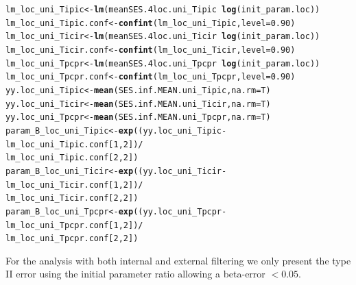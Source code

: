\documentclass[12pt]{article}\usepackage[]{graphicx}\usepackage[]{color}
\makeatletter
\newcommand{\hlnum}[1]{\textcolor[rgb]{0.686,0.059,0.569}{#1}}%
\newcommand{\hlopt}[1]{\textcolor[rgb]{0,0,0}{#1}}%
\newcommand{\hlstd}[1]{\textcolor[rgb]{0.345,0.345,0.345}{#1}}%
\newcommand{\hlkwb}[1]{\textcolor[rgb]{0.69,0.353,0.396}{#1}}%
\newcommand{\hlkwc}[1]{\textcolor[rgb]{0.333,0.667,0.333}{#1}}%
\newcommand{\hlkwd}[1]{\textcolor[rgb]{0.737,0.353,0.396}{\textbf{#1}}}%
\newenvironment{kframe}{%
 \def\at@end@of@kframe{}%
 \ifinner\ifhmode%
  \def\at@end@of@kframe{\end{minipage}}%
  \begin{minipage}{\columnwidth}%
 \fi\fi%
 \def\FrameCommand##1{\hskip\@totalleftmargin \hskip-\fboxsep
 \colorbox{shadecolor}{##1}\hskip-\fboxsep
     \hskip-\linewidth \hskip-\@totalleftmargin \hskip\columnwidth}%
 \MakeFramed {\advance\hsize-\width
   \@totalleftmargin\z@ \linewidth\hsize
   \@setminipage}}%
 {\par\unskip\endMakeFramed%
 \at@end@of@kframe}
\newenvironment{knitrout}{}{} %
\makeatother
\begin{document}
\begin{knitrout}
\begin{kframe}
\begin{alltt}
\hlstd{lm_loc_uni_Tipic} \hlkwb{<-} \hlkwd{lm}\hlstd{(meanSES.4loc.uni_Tipic} \hlopt{~} \hlkwd{log}\hlstd{(init_param.loc))}
\hlstd{lm_loc_uni_Tipic.conf} \hlkwb{<-} \hlkwd{confint}\hlstd{(lm_loc_uni_Tipic,} \hlkwc{level} \hlstd{=} \hlnum{0.90}\hlstd{)}
\hlstd{lm_loc_uni_Ticir} \hlkwb{<-} \hlkwd{lm}\hlstd{(meanSES.4loc.uni_Ticir} \hlopt{~} \hlkwd{log}\hlstd{(init_param.loc))}
\hlstd{lm_loc_uni_Ticir.conf} \hlkwb{<-} \hlkwd{confint}\hlstd{(lm_loc_uni_Ticir,} \hlkwc{level} \hlstd{=} \hlnum{0.90}\hlstd{)}
\hlstd{lm_loc_uni_Tpcpr} \hlkwb{<-} \hlkwd{lm}\hlstd{(meanSES.4loc.uni_Tpcpr} \hlopt{~} \hlkwd{log}\hlstd{(init_param.loc))}
\hlstd{lm_loc_uni_Tpcpr.conf} \hlkwb{<-} \hlkwd{confint}\hlstd{(lm_loc_uni_Tpcpr,} \hlkwc{level} \hlstd{=} \hlnum{0.90}\hlstd{)}
\hlstd{yy.loc_uni_Tipic} \hlkwb{<-} \hlkwd{mean}\hlstd{(SES.inf.MEAN.uni_Tipic,} \hlkwc{na.rm} \hlstd{= T)}
\hlstd{yy.loc_uni_Ticir} \hlkwb{<-} \hlkwd{mean}\hlstd{(SES.inf.MEAN.uni_Ticir,} \hlkwc{na.rm} \hlstd{= T)}
\hlstd{yy.loc_uni_Tpcpr} \hlkwb{<-} \hlkwd{mean}\hlstd{(SES.inf.MEAN.uni_Tpcpr,} \hlkwc{na.rm} \hlstd{= T)}
\hlstd{param_B_loc_uni_Tipic} \hlkwb{<-} \hlkwd{exp}\hlstd{( (yy.loc_uni_Tipic} \hlopt{-} \hlstd{lm_loc_uni_Tipic.conf [}\hlnum{1}\hlstd{,} \hlnum{2}\hlstd{])} \hlopt{/}
                                  \hlstd{lm_loc_uni_Tipic.conf [}\hlnum{2}\hlstd{,} \hlnum{2}\hlstd{] )}
\hlstd{param_B_loc_uni_Ticir} \hlkwb{<-} \hlkwd{exp}\hlstd{( (yy.loc_uni_Ticir} \hlopt{-} \hlstd{lm_loc_uni_Ticir.conf [}\hlnum{1}\hlstd{,} \hlnum{2}\hlstd{])} \hlopt{/}
                                  \hlstd{lm_loc_uni_Ticir.conf [}\hlnum{2}\hlstd{,} \hlnum{2}\hlstd{] )}
\hlstd{param_B_loc_uni_Tpcpr} \hlkwb{<-} \hlkwd{exp}\hlstd{( (yy.loc_uni_Tpcpr} \hlopt{-} \hlstd{lm_loc_uni_Tpcpr.conf [}\hlnum{1}\hlstd{,} \hlnum{2}\hlstd{])} \hlopt{/}
                                  \hlstd{lm_loc_uni_Tpcpr.conf [}\hlnum{2}\hlstd{,} \hlnum{2}\hlstd{] )}
\end{alltt}
\end{kframe}
\end{knitrout}

For the analysis with both internal and external filtering we only present the type II error using the initial parameter ratio allowing a beta-error $<0.05$.  
\end{document}
